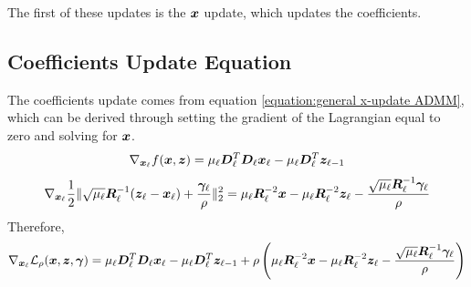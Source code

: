 The first of these updates is the $\bm{x}$ update, which updates the coefficients.


\subsection{Coefficients Update Equation}
The coefficients update comes from equation \ref{equation:general x-update ADMM}, which can be derived through setting the gradient of the Lagrangian equal to zero and solving for $\bm{x}$.
%
\begin{equation}
\nabla_{\bm{x}_{\ell}} f(\bm{x},\bm{z}) = \mu_{\ell}\bm{D}_{\ell}^T\bm{D}_{\ell}\bm{x}_{\ell} - \mu_{\ell}\bm{D}_{\ell}^T\bm{z}_{\ell - 1}
\end{equation}
%
\begin{equation}
\nabla_{\bm{x}_{\ell}} \frac{1}{2}\|\sqrt{\mu_{\ell}}\bm{R}_{\ell}^{-1}(\bm{z}_{\ell} - \bm{x}_{\ell}) + \frac{\bm{\gamma}_{\ell}}{\rho}\|_2^2 = \mu_{\ell}\bm{R}_{\ell}^{-2}\bm{x} - \mu_{\ell}\bm{R}_{\ell}^{-2}\bm{z}_{\ell} - \frac{\sqrt{\mu_{\ell}}\bm{R}_{\ell}^{-1}\bm{\gamma}_{\ell}}{\rho}
\end{equation}
%
Therefore,
%
\begin{equation}
\nabla_{\bm{x}_{\ell}} \mathcal{L}_{\rho}(\bm{x},\bm{z},\bm{\gamma}) = \mu_{\ell}\bm{D}_{\ell}^T\bm{D}_{\ell}\bm{x}_{\ell} - \mu_{\ell}\bm{D}_{\ell}^T\bm{z}_{\ell - 1} + \rho\left(\mu_{\ell}\bm{R}_{\ell}^{-2}\bm{x} - \mu_{\ell}\bm{R}_{\ell}^{-2}\bm{z}_{\ell} - \frac{\sqrt{\mu_{\ell}}\bm{R}_{\ell}^{-1}\bm{\gamma}_{\ell}}{\rho}\right)
\end{equation}

